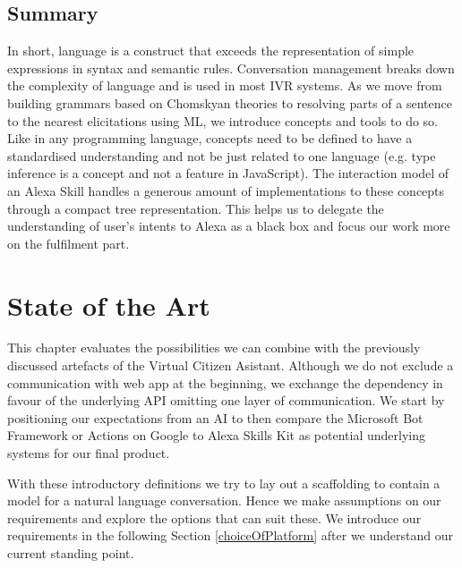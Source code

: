 \section{Summary}

In short, 
language is a construct that exceeds the representation of simple expressions in syntax and semantic rules.
Conversation management  %
breaks down the complexity of language and is used in most IVR systems. As we move from building grammars based on Chomskyan theories to resolving parts of a sentence to the nearest elicitations using ML, we introduce concepts and tools to do so. Like in any programming language, concepts need to be defined to have a standardised understanding and not be just related to one language (e.g. type inference is a concept and not a feature in JavaScript).  The interaction model of an Alexa Skill handles a generous amount of implementations to these concepts through a compact tree representation. This helps us to delegate the understanding of user's intents to Alexa as a black box and focus our work more on the fulfilment part. 








\chapter{State of the Art}
\label{stateofzart}


This chapter evaluates the possibilities we can combine with the previously discussed artefacts of the Virtual Citizen Asistant. Although we do not exclude a communication with web app at the beginning, we exchange the dependency in favour of the underlying API omitting one layer of communication. We start by positioning our expectations from an AI to then compare the Microsoft Bot Framework or Actions on Google to Alexa Skills Kit as potential underlying systems for our final product.

With these introductory definitions we try to lay out a scaffolding %
to contain a model for a natural language conversation. Hence we make assumptions on our requirements and explore the options that can suit these. We introduce our requirements in the following Section \ref{choiceOfPlatform} after we understand our current standing point.



